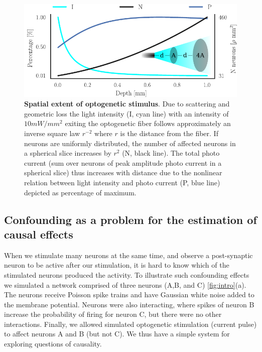 \documentclass[11pt]{article}
\begin{document}
\begin{figure}\includegraphics[scale=1]{opto-powerlaw}
\caption{{\bf Spatial extent of optogenetic stimulus}. 
Due to scattering and geometric loss the light intensity (I, cyan line) with an intensity of $10 mW/mm^2$ exiting the optogenetic fiber follows approximately an inverse square law $ r^{-2} $ where $ r $ is the distance from the fiber. 
If neurons are uniformly distributed, the number of affected neurons in a spherical slice increases by $ r^{2} $ (N, black line). 
The total photo current (sum over neurons of peak amplitude photo current in a spherical slice) thus increases with distance due to the nonlinear relation between light intensity and photo current (P, blue line) depicted as percentage of maximum.}
\label{fig:concept}
\end{figure}

\FloatBarrier
\subsection{Confounding as a problem for the estimation of causal effects}
When we stimulate many neurons at the same time, and observe a post-synaptic neuron to be active after our stimulation, it is hard to know which of the stimulated neurons produced the activity. 
To illustrate such confounding effects we simulated a network comprised of three neurons (A,B, and C) \cref{fig:intro}(a). 
The neurons receive Poisson spike trains and have Gaussian white noise added to the membrane potential. 
Neurons were also interacting, where spikes of neuron B increase the probability of firing for neuron C, but there were no other interactions.
Finally, we allowed simulated optogenetic stimulation (current pulse) to affect neurons A and B (but not C). 
We thus have a simple system for exploring questions of causality.
\end{document}
